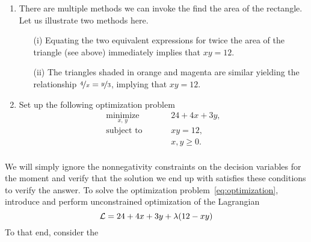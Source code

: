 \begin{minipage}{0.5\textwidth}
\begin{center}
\end{center}
\end{minipage}
%

\begin{enumerate}
    \setlength\itemsep{0em}
    \item There are multiple methods we can invoke the find the area of the
    rectangle. Let us illustrate two methods here.

    \begin{enumerate}
    \item[(i)] Equating the two equivalent expressions for twice the area of
    the triangle (see above) immediately implies that $xy = 12$.
    \item[(ii)] The triangles shaded in orange and magenta are similar yielding
    the relationship $\nicefrac{4}{x} = \nicefrac{y}{3}$, implying that $xy =
    12$.
    \end{enumerate}

    \item Set up the following optimization problem 
    \begin{equation}
    \begin{aligned}
        \underset{x, \, y }{\textrm{minimize}} && &24 + 4x + 3y , \\
        \textrm{subject to} 
        &&\quad &xy = 12, \\
        &&\quad &x,y \geq 0.  \\
    \end{aligned}    
    \label{eq:optimization}
\end{equation}
\end{enumerate}
%
We will simply ignore the nonnegativity constraints on the decision variables
for the moment and verify that the solution we end up with satisfies these
conditions to verify the answer. To solve the optimization
problem~\eqref{eq:optimization}, introduce and perform unconstrained
optimization of the Lagrangian
\[ \mathcal{L} = 24 + 4x + 3y + \lambda(12-xy) \] To that end, consider the
